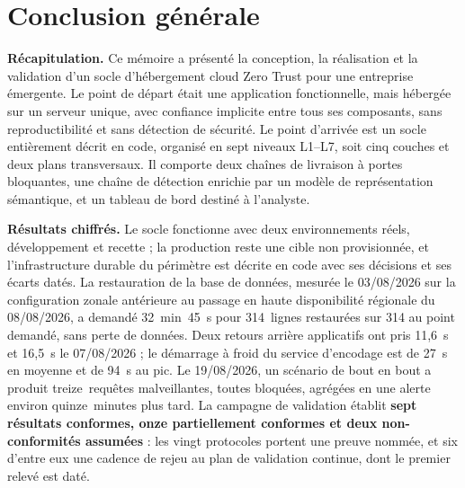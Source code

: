 \chapter*{Conclusion générale}

\textbf{Récapitulation.} Ce mémoire a présenté la conception, la réalisation et la validation
d'un socle d'hébergement cloud Zero Trust pour une entreprise émergente. Le point de départ
était une application fonctionnelle, mais hébergée sur un serveur unique, avec confiance
implicite entre tous ses composants, sans reproductibilité et sans détection de sécurité. Le
point d'arrivée est un socle entièrement décrit en code, organisé en sept niveaux L1--L7, soit
cinq couches et deux plans transversaux. Il comporte deux chaînes de livraison à portes
bloquantes, une chaîne de détection enrichie par un modèle de représentation sémantique, et un
tableau de bord destiné à l'analyste.

\textbf{Résultats chiffrés.} Le socle fonctionne avec deux environnements réels, développement
et recette ; la production reste une cible non provisionnée, et l'infrastructure durable du
périmètre est décrite en code avec ses décisions et ses écarts datés. La restauration de la base
de données, mesurée le 03/08/2026 sur la configuration zonale antérieure au passage en haute
disponibilité régionale du 08/08/2026, a demandé 32~min~45~s pour 314~lignes restaurées sur 314
au point demandé, sans perte de données. Deux retours arrière applicatifs ont pris 11,6~s et
16,5~s le 07/08/2026 ; le démarrage à froid du service d'encodage est de 27~s en moyenne et de
94~s au pic. Le 19/08/2026, un scénario de bout en bout a produit treize~requêtes malveillantes,
toutes bloquées, agrégées en une alerte environ quinze~minutes plus tard. La campagne de
validation établit \textbf{sept résultats conformes, onze partiellement conformes et deux
non-conformités assumées} : les vingt protocoles portent une preuve nommée, et six d'entre eux
une cadence de rejeu au plan de validation continue, dont le premier relevé est daté.

